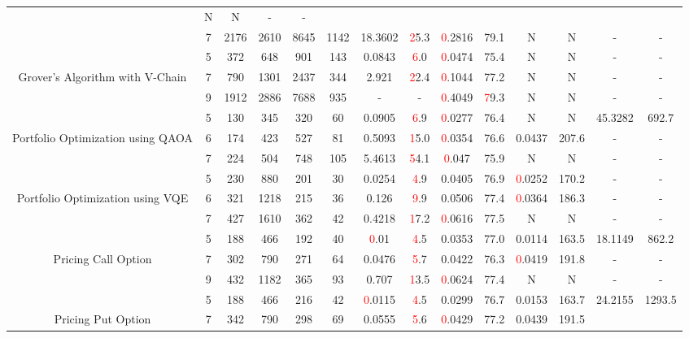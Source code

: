 \begin{table}[htb]
{\begin{tabular}{|c|c|c|c|c|c|c|c|c|c|c|c|c|c|}
 & N & N 
 & - & -
 \\
 & 
7 & 2176 & 2610 & 8645 & 1142
 & 18.3602 & \textcolor{red}25.3
 & \textcolor{red}0.2816 & 79.1
 & N & N 
 & - & -
 \\
\hline
 & 
5 & 372 & 648 & 901 & 143
 & 0.0843 & \textcolor{red}6.0
 & \textcolor{red}0.0474 & 75.4
 & N & N 
 & - & -
 \\
Grover's Algorithm with V-Chain & 
7 & 790 & 1301 & 2437 & 344
 & 2.921 & \textcolor{red}22.4
 & \textcolor{red}0.1044 & 77.2
 & N & N 
 & - & -
 \\
 & 
9 & 1912 & 2886 & 7688 & 935
 & - & -
 & \textcolor{red}0.4049 & \textcolor{red}79.3
 & N & N 
 & - & -
 \\
\hline
 & 
5 & 130 & 345 & 320 & 60
 & 0.0905 & \textcolor{red}6.9
 & \textcolor{red}0.0277 & 76.4
 & N & N 
 & 45.3282 & 692.7
 \\
Portfolio Optimization using QAOA & 
6 & 174 & 423 & 527 & 81
 & 0.5093 & \textcolor{red}15.0
 & \textcolor{red}0.0354 & 76.6
 & 0.0437 & 207.6
 & - & -
 \\
 & 
7 & 224 & 504 & 748 & 105
 & 5.4613 & \textcolor{red}54.1
 & \textcolor{red}0.047 & 75.9
 & N & N 
 & - & -
 \\
\hline
 & 
5 & 230 & 880 & 201 & 30
 & 0.0254 & \textcolor{red}4.9
 & 0.0405 & 76.9
 & \textcolor{red}0.0252 & 170.2
 & - & -
 \\
Portfolio Optimization using VQE & 
6 & 321 & 1218 & 215 & 36
 & 0.126 & \textcolor{red}9.9
 & 0.0506 & 77.4
 & \textcolor{red}0.0364 & 186.3
 & - & -
 \\
 & 
7 & 427 & 1610 & 362 & 42
 & 0.4218 & \textcolor{red}17.2
 & \textcolor{red}0.0616 & 77.5
 & N & N 
 & - & -
 \\
\hline
 & 
5 & 188 & 466 & 192 & 40
 & \textcolor{red}0.01 & \textcolor{red}4.5
 & 0.0353 & 77.0
 & 0.0114 & 163.5
 & 18.1149 & 862.2
 \\
Pricing Call Option & 
7 & 302 & 790 & 271 & 64
 & 0.0476 & \textcolor{red}5.7
 & 0.0422 & 76.3
 & \textcolor{red}0.0419 & 191.8
 & - & -
 \\
 & 
9 & 432 & 1182 & 365 & 93
 & 0.707 & \textcolor{red}13.5
 & \textcolor{red}0.0624 & 77.4
 & N & N 
 & - & -
 \\
\hline
 & 
5 & 188 & 466 & 216 & 42
 & \textcolor{red}0.0115 & \textcolor{red}4.5
 & 0.0299 & 76.7
 & 0.0153 & 163.7
 & 24.2155 & 1293.5
 \\
Pricing Put Option & 
7 & 342 & 790 & 298 & 69
 & 0.0555 & \textcolor{red}5.6
 & \textcolor{red}0.0429 & 77.2
 & 0.0439 & 191.5

\end{tabular}}
\end{table}
